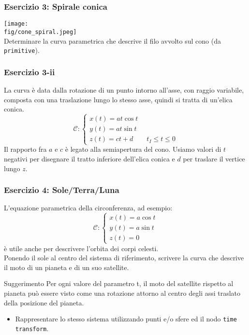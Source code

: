 \documentclass{beamer}
\newcommand{\fig}{figures} %
\begin{document}
%
\begin{frame}
\frametitle{Esercizio 3: Spirale conica}
\texttt{[image: \\fig/cone\_spiral.jpeg]}\\
Determinare la curva parametrica che descrive il filo avvolto sul cono (da \texttt{primitive}). 
\end{frame}
\begin{frame}
\frametitle{Esercizio 3-ii}
La curva \`e data dalla rotazione di un punto intorno all'asse, con raggio
variabile, composta con una traslazione lungo lo stesso asse, quindi si tratta
di un'elica conica.  
\begin{displaymath}
\mathcal{C}:\begin{cases}
 x(t)= at\cos t\\
 y(t)=at \sin t\\
  z(t)= ct + d \qquad t_I\leq t\leq 0
\end{cases}
\end{displaymath}
Il rapporto fra $a$ e $c$ \`e legato alla semiapertura del cono. Usiamo valori
di $t$ negativi per disegnare il tratto inferiore dell'elica conica e $d$ per
traslare il vertice lungo $z$.  
\end{frame}
\begin{frame}
\frametitle{Esercizio 4: Sole/Terra/Luna}
L'equazione parametrica della circonferenza, ad esempio:
\begin{displaymath}
\mathcal{C}:\begin{cases}
 x(t)= a \cos t\\
 y(t)= a \sin t\\
 z(t)= 0
\end{cases}
\end{displaymath}
\`e utile anche per descrivere l'orbita dei corpi celesti. \\
Ponendo il sole al centro del sistema di riferimento, scrivere la curva che descrive il moto di un pianeta e di un suo satellite.\\
\begin{block}{Suggerimento}
Per ogni valore del parametro t, il moto del satellite rispetto al pianeta pu\`o essere visto come una rotazione
attorno al centro degli assi traslato della posizione del pianeta.  
\end{block}
\begin{itemize}
\item Rappresentare lo stesso sistema utilizzando punti e/o sfere ed il nodo \texttt{time transform}.
\end{itemize}
\end{frame}
\end{document}

